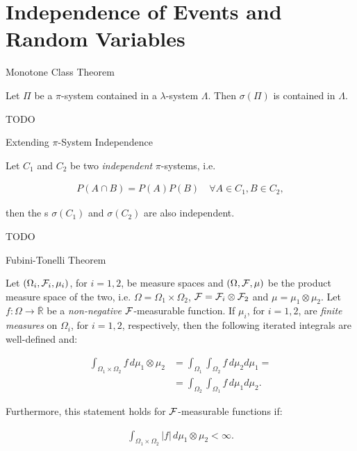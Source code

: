 
\section{Independence of Events and Random Variables}

\begin{theorem}{6.3}{Monotone Class Theorem}

    Let $\Pi$ be a $\pi$-system contained in a $\lambda$-system $\Lambda$. Then $\sigma(\Pi)$ is contained in $\Lambda$.

    \Hint TODO

\end{theorem}

\begin{proposition}{6.4}{Extending $\pi$-System Independence}

    Let $C_1$ and $C_2$ be two \emph{independent} $\pi$-systems, i.e.

        \begin{align*}
            P(A \cap B) = P(A)P(B) \quad \forall A \in C_1, B \in C_2,
        \end{align*}

    then the \SigmaAlgebra s $\sigma(C_1)$ and $\sigma(C_2)$ are also independent.

    \Hint TODO

\end{proposition}

\begin{theorem}{6.7}{Fubini-Tonelli Theorem}

    Let $(\Omega_i, \mathcal{F}_i, \mu_i)$, for $i = 1,2$, be measure spaces and $(\Omega, \mathcal{F}, \mu)$ be the product measure space of the two, i.e. $\Omega = \Omega_1 \times \Omega_2$, $\mathcal{F} = \mathcal{F}_i \otimes \mathcal{F}_2$ and $\mu = \mu_1 \otimes \mu_2$. Let $f: \Omega \to \overline{\mathbb{R}}$ be a \emph{non-negative} $\mathcal{F}$-measurable function. If $\mu_i$, for $i = 1,2$, are \emph{finite measures} on $\Omega_i$, for $i = 1,2$, respectively, then the following iterated integrals are well-defined and:

        \begin{align*}
            \int_{\Omega_1 \times \Omega_2} f \, d\mu_1 \otimes \mu_2 &= \int_{\Omega_1} \int_{\Omega_2} f \, d\mu_2 d\mu_1 = \\ &= \int_{\Omega_2} \int_{\Omega_1} f \, d\mu_1 d\mu_2.
        \end{align*}

    Furthermore, this statement holds for $\mathcal{F}$-measurable functions if:

        \begin{align*}
            \int_{\Omega_1 \times \Omega_2} |f| \, d\mu_1 \otimes \mu_2 < \infty.
        \end{align*}

\end{theorem}

